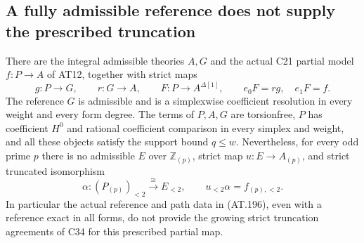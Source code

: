 \subsection{A fully admissible reference does not supply the prescribed truncation}

\begin{theorem}
\label{AT28}
There are the integral admissible theories $A,G$ and the actual
C21 partial model $f:P\to A$ of AT12, together with strict maps
\[
 g:P\longrightarrow G,\qquad r:G\longrightarrow A,\qquad
 F:P\longrightarrow A^{\Delta[1]},\qquad
 e_0F=rg,\quad e_1F=f.
 \tag{AT.196}
\]
The reference $G$ is admissible and is a simplexwise coefficient
resolution in every weight and every form degree.
The terms of $P,A,G$ are torsionfree, $P$ has coefficient $H^0$
and rational coefficient comparison in every simplex and weight,
and all these objects satisfy the support bound $q\leq w$.
Nevertheless, for every odd prime $p$ there is no admissible
$E$ over $\mathbb Z_{(p)}$, strict map $u:E\to A_{(p)}$, and
strict truncated isomorphism
\[
 \alpha:(P_{(p)})_{<2}\xrightarrow{\ \cong\ }E_{<2},
 \qquad u_{<2}\alpha=f_{(p),<2}.
 \tag{AT.197}
\]
In particular the actual reference and path data in
\textup{(AT.196)}, even with a reference exact in all forms,
do not provide the growing strict truncation agreements of C34
for this prescribed partial map.
\end{theorem}

